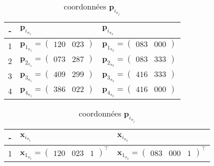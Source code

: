\documentclass[../CSC_5RO17_TA_TP1.tex]{subfiles}
\begin{document}
\begin{table}[H]
    \centering
    \begin{subtable}[H]{0.475\textwidth}
        \begin{tabular}{cll}
            \hline
            - & $\mathbf{p}_{i_{\pi_1}}$ & $\mathbf{p}_{i_{\pi_2}}$\\
            \hline
            1 & $\mathbf{p}_{1_{\pi_1}} = \begin{pmatrix}120 & 023\end{pmatrix}$ & $\mathbf{p}_{1_{\pi_2}} = \begin{pmatrix}083 & 000\end{pmatrix}$\\
            2 & $\mathbf{p}_{2_{\pi_1}} = \begin{pmatrix}073 & 287\end{pmatrix}$ & $\mathbf{p}_{2_{\pi_2}} = \begin{pmatrix}083 & 333\end{pmatrix}$\\
            3 & $\mathbf{p}_{3_{\pi_1}} = \begin{pmatrix}409 & 299\end{pmatrix}$ & $\mathbf{p}_{3_{\pi_2}} = \begin{pmatrix}416 & 333\end{pmatrix}$\\
            4 & $\mathbf{p}_{4_{\pi_1}} = \begin{pmatrix}386 & 022\end{pmatrix}$ & $\mathbf{p}_{4_{\pi_2}} = \begin{pmatrix}416 & 000\end{pmatrix}$\\
            \hline
        \end{tabular}
        \caption{coordonnées $\mathbf{p}_{i_{\pi_{j}}}$}
        \label{tab_homography_points}
    \end{subtable}
    \begin{subtable}[H]{0.475\textwidth}
        \begin{tabular}{cll}
            \hline
            - & $\mathbf{x}_{i_{\pi_1}}$ & $\mathbf{x}_{i_{\pi_2}}$\\
            \hline
            1 & $\mathbf{x}_{1_{\pi_1}} = \begin{pmatrix}120 & 023 & 1\end{pmatrix}^{\intercal}$ & $\mathbf{x}_{1_{\pi_2}} = \begin{pmatrix}083 & 000 & 1\end{pmatrix}^{\intercal}$\\

\end{tabular}
\end{subtable}
\end{table}
\end{document}
